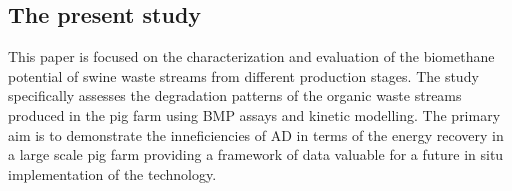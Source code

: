 \subsection{The present study}
This paper is focused on the characterization and evaluation of the biomethane potential of swine waste streams from different production stages. The study specifically assesses the degradation patterns of the organic waste streams produced in the pig farm using BMP assays and kinetic modelling. The primary aim is to demonstrate the inneficiencies of AD in terms of the energy recovery in a large scale pig farm providing a framework of data valuable for a future in situ implementation of the technology.